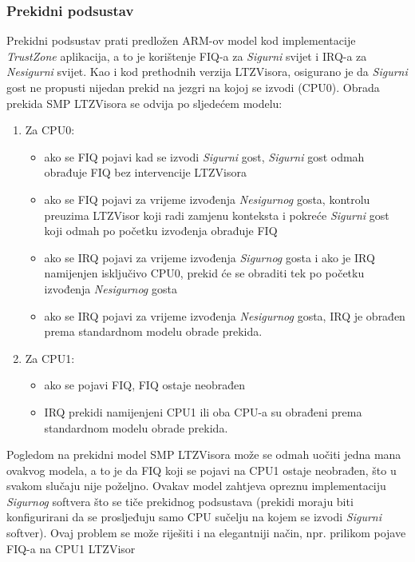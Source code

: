 \documentclass[times, utf8, diplomski, numeric]{fer}
\begin{document}
\subsubsection{Prekidni podsustav}
Prekidni podsustav prati predložen ARM-ov model kod implementacije \textit{TrustZone} aplikacija, a to je korištenje FIQ-a za
\textit{Sigurni} svijet i IRQ-a za \textit{Nesigurni} svijet. Kao i kod prethodnih verzija LTZVisora,
osigurano je da \textit{Sigurni} gost ne propusti nijedan prekid na jezgri na kojoj se izvodi (CPU0). Obrada prekida SMP
LTZVisora se odvija po sljedećem modelu:
\begin{enumerate}
  \item{Za CPU0:}
    \begin{itemize}
      \item{ako se FIQ pojavi kad se izvodi \textit{Sigurni} gost, \textit{Sigurni} gost odmah obrađuje FIQ bez intervencije
      LTZVisora}
      \item{ako se FIQ pojavi za vrijeme izvođenja \textit{Nesigurnog} gosta, kontrolu preuzima LTZVisor koji radi zamjenu
      konteksta i pokreće \textit{Sigurni} gost koji odmah po početku izvođenja obrađuje FIQ}
      \item{ako se IRQ pojavi za vrijeme izvođenja \textit{Sigurnog} gosta i ako je IRQ namijenjen isključivo CPU0, prekid će
      se obraditi tek po početku izvođenja \textit{Nesigurnog} gosta}
      \item{ako se IRQ pojavi za vrijeme izvođenja \textit{Nesigurnog} gosta, IRQ je obrađen prema standardnom modelu obrade
      prekida.}
    \end{itemize}
  \item{Za CPU1:}
    \begin{itemize}
      \item{ako se pojavi FIQ, FIQ ostaje neobrađen}
      \item{IRQ prekidi namijenjeni CPU1 ili oba CPU-a su obrađeni prema standardnom modelu obrade prekida.}
    \end{itemize}
\end{enumerate}
Pogledom na prekidni model SMP LTZVisora može se odmah uočiti jedna mana ovakvog modela, a to je da FIQ koji se pojavi na CPU1
ostaje neobrađen, što u svakom slučaju nije poželjno. Ovakav model zahtjeva opreznu implementaciju \textit{Sigurnog} softvera
što se tiče prekidnog podsustava (prekidi moraju biti konfigurirani da se prosljeđuju samo CPU sučelju na kojem se izvodi
\textit{Sigurni} softver). Ovaj problem se može riješiti i na elegantniji način, npr. prilikom pojave FIQ-a na CPU1 LTZVisor
\end{document}

